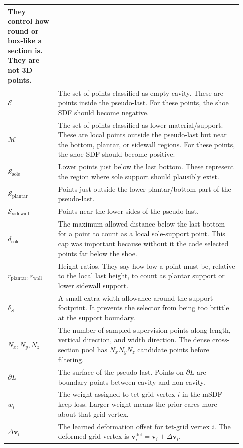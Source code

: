 \documentclass[11pt]{article}
\newcommand{\vtx}{\mathbf{v}}
\begin{document}
\begin{longtable}{p{0.20\linewidth}p{0.73\linewidth}}
They control how round or box-like a section is.  They are not 3D points. \\
\midrule
\(\mathcal{E}\) &
The set of points classified as empty cavity.  These are points inside the
pseudo-last.  For these points, the shoe SDF should become negative. \\
\midrule
\(\mathcal{M}\) &
The set of points classified as lower material/support.  These are local
points outside the pseudo-last but near the bottom, plantar, or sidewall
regions.  For these points, the shoe SDF should become positive. \\
\midrule
\(\mathcal{S}_{\mathrm{sole}}\) &
Lower points just below the last bottom.  These represent the region where sole
support should plausibly exist. \\
\midrule
\(\mathcal{S}_{\mathrm{plantar}}\) &
Points just outside the lower plantar/bottom part of the pseudo-last. \\
\midrule
\(\mathcal{S}_{\mathrm{sidewall}}\) &
Points near the lower sides of the pseudo-last. \\
\midrule
\(d_{\mathrm{sole}}\) &
The maximum allowed distance below the last bottom for a point to count as a
local sole-support point.  This cap was important because without it the code
selected points far below the shoe. \\
\midrule
\(r_{\mathrm{plantar}},r_{\mathrm{wall}}\) &
Height ratios.  They say how low a point must be, relative to the local last
height, to count as plantar support or lower sidewall support. \\
\midrule
\(\delta_S\) &
A small extra width allowance around the support footprint.  It prevents the
selector from being too brittle at the support boundary. \\
\midrule
\(N_x,N_y,N_z\) &
The number of sampled supervision points along length, vertical direction, and
width direction.  The dense cross-section pool has \(N_xN_yN_z\) candidate
points before filtering. \\
\midrule
\(\partial L\) &
The surface of the pseudo-last.  Points on \(\partial L\) are boundary points
between cavity and non-cavity. \\
\midrule
\(w_i\) &
The weight assigned to tet-grid vertex \(i\) in the mSDF keep loss.  Larger
weight means the prior cares more about that grid vertex. \\
\midrule
\(\Delta\vtx_i\) &
The learned deformation offset for tet-grid vertex \(i\).  The deformed grid
vertex is \(\vtx_i^{\mathrm{def}}=\vtx_i+\Delta\vtx_i\). \\

\end{longtable}
\end{document}
